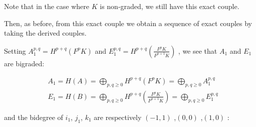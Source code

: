 \documentclass[../main.tex]{subfiles}
\begin{document}
Note that in the case where $K$ is non-graded, we still have this exact couple.

Then, as before, from this exact couple we obtain a sequence of exact couples by taking the derived couples.

Setting $A_1^{p,q} = H^{p+q}(F^pK)$ and $E_1^{p,q} = H^{p+q}\left( \frac{F^pK}{F^{p+1}K} \right) $ , we see that $A_1$ and $E_1$ are bigraded:

\begin{align*}
&A_1 = H(A) = \bigoplus\limits_{p,q \geq 0}H^{p+q}(F^pK) = \bigoplus\limits_{p,q \geq 0}A_1^{p,q} \\
&E_1 = H(B) = \bigoplus\limits_{p,q \geq 0}H^{p+q}\left( \frac{F^pK}{F^{p+1}K} \right) = \bigoplus\limits_{p,q \geq 0}E_1^{p,q}
\end{align*}

and the bidegree of $i_1$, $j_1$, $k_1$ are respectively $(-1,1)$ ,$(0,0)$ ,$(1,0)$ :
\end{document}
